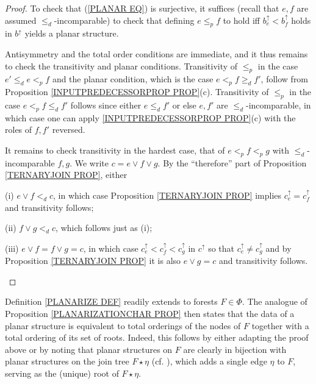 \documentclass[a4paper,10pt]{article}%
\begin{document}
\begin{proof}
To check that (\ref{PLANAR EQ}) is surjective, it suffices (recall that $e,f$ are assumed $\leq_d$-incomparable) to check that
defining $e \leq_p f$ to hold iff $b^{\uparrow}_e < b^{\uparrow}_f$ holds in $b^{\uparrow}$ yields a planar structure.

Antisymmetry and the total order conditions are immediate, and it thus remains to check the transitivity and planar conditions.
Transitivity of $\leq_p$ in the case $e' \leq_d e <_p f$ and the planar condition, which is the case $e <_p f \geq_d f'$, follow from Proposition \ref{INPUTPREDECESSORPROP PROP}(c). Transitivity of $\leq_p$ in the case $e <_p f \leq_d f'$
follows since either $e \leq_d f'$ or else $e,f'$ are $\leq_d$-incomparable, in which case one can apply \ref{INPUTPREDECESSORPROP PROP}(c) with the roles of $f,f'$ reversed.

It remains to check transitivity in the hardest case, that of 
$e <_p f <_p g$ with $\leq_d$-incomparable $f,g$.
We write $c = e \vee f \vee g$.
By the ``therefore'' part of Proposition \ref{TERNARYJOIN PROP}, either
\begin{inparaenum}
	\item[(i)] $e \vee f <_d c$, in which case 
	Proposition \ref{TERNARYJOIN PROP}
	implies 
	$c^{\uparrow}_e = c^{\uparrow}_f$ and transitivity follows;
	\item[(ii)] $f \vee g <_d c$, which follows just as (i);
	\item[(iii)]  
$e \vee f = f \vee g =c$, in which case 
$c^{\uparrow}_e <
c^{\uparrow}_f <
c^{\uparrow}_g $ in $c^{\uparrow}$
so that $c^{\uparrow}_e \neq c^{\uparrow}_g$ and by Proposition \ref{TERNARYJOIN PROP} it is also 
$e \vee g = c$ and transitivity follows.
\end{inparaenum}
\end{proof}



\begin{remark}
	Definition \ref{PLANARIZE DEF} readily extends to forests $F \in \Phi$. The analogue of Proposition \ref{PLANARIZATIONCHAR PROP} then states that the data of a planar structure is 
equivalent to total orderings of the nodes of $F$ together with a total ordering of its set of roots.
Indeed, this follows by either adapting the proof above or by noting that planar structures on $F$ are clearly in bijection with planar structures on the join tree $F \star \eta$ 
(cf. \cite[Def. 7.44]{Pe16b}), which adds a single edge $\eta$ to $F$, serving as the (unique) root of $F \star \eta$.
\end{remark}
\end{document}

